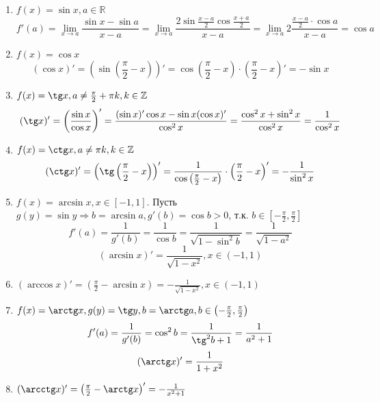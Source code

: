 \documentclass[12pt]{article}
\newenvironment{MyList}[1][4pt]{
  \begin{enumerate}[1.]
  \setlength{\parskip}{0pt}
  \setlength{\itemsep}{#1}
}{       
  \end{enumerate}
}
\def\R{\mathbb{R}}       %
\def\Z{\mathbb{Z}}       %
\def\SO{\Rightarrow}     %
\theoremstyle{definition} %
\theoremstyle{plain} %
\theoremstyle{remark} %
\begin{document}
\begin{MyList}
    \[f'(0) = \lim_{x \to 0} \frac{x^\alpha}{x} = \lim_{x \to 0} x^{\alpha - 1} = \begin{cases}
        0, \alpha > 1 \\
        1, \alpha = 1 \\
        \infty, \alpha < 1
    \end{cases}\]
    Выводы: $(x^\alpha)' = \alpha \cdot x^{\alpha - 1}$ (с точностью до области определения функции).

    \item $f(x) = \sin x, a \in \R$ 
    \[f'(a) = \lim_{x \to a} \frac{\sin x - \sin a}{x - a} = \lim_{x \to a} \frac{2 \sin \frac{x - a}{2} \cos \frac{x + a}{2}}{x - a} = \lim_{x \to a}2 \frac{ \frac{x - a}{2} \cdot \cos a}{x - a} = \cos a\]
    
    \item $f(x) = \cos x$
    \[(\cos x)' = \left(\sin \left(\frac{\pi}{2} - x\right)\right)' = \cos \left(\frac{\pi}{2} - x\right) \cdot \left(\frac{\pi}{2} - x\right)' = -\sin x\]

    \item $f(x) = \tg x, a \neq \frac{\pi}{2} + \pi k, k \in \Z$ 
    \[(\tg x)' = \left( \frac{\sin x}{\cos x}\right)' = \frac{(\sin x)' \cos x - \sin x (\cos x)'}{\cos^2 x} = \frac{\cos^2 x + \sin^2x}{\cos^2 x} = \frac{1}{\cos^2 x}\]

    \item $f(x) = \ctg x, a \neq \pi k, k \in \Z$ 
    \[(\ctg x)' = \left(\tg \left(\frac{\pi}{2} - x\right)\right)' = \frac{1}{\cos \left(\frac{\pi}{2} - x\right)} \cdot \left(\frac{\pi}{2} - x\right)' = -\frac{1}{\sin^2 x}\]

    \item $f(x) = \arcsin x, x \in [-1, 1]$. Пусть $g(y) = \sin y \SO b = \arcsin a, g'(b) = \cos b > 0$, т.к. $b \in \left[-\frac{\pi}{2}, \frac{\pi}{2}\right]$ 
    \[f'(a) = \frac{1}{g'(b)} = \frac{1}{\cos b} = \frac{1}{\sqrt{1 - \sin^2 b}} = \frac{1}{\sqrt{1 - a^2}}\]
    \[(\arcsin x)' = \frac{1}{\sqrt{1 - x^2}}, x \in (-1, 1)\]

    \item $(\arccos x)' = \left(\frac{\pi}{2} - \arcsin x\right) = -\frac{1}{\sqrt{1 - x^2}}, x \in (-1, 1)$
    \item $f(x) = \arctg x, g(y) = \tg y, b = \arctg a, b \in \left(-\frac{\pi}{2}, \frac{\pi}{2}\right)$
    \[f'(a) = \frac{1}{g'(b)} = \cos^2 b = \frac{1}{\tg^2 b + 1} = \frac{1}{a^2 + 1}\]
    \[(\arctg x)' = \frac{1}{1 + x^2}\]

    \item $(\arcctg x)' = \left(\frac{\pi}{2} - \arctg x\right)' = -\frac{1}{x^2 + 1}$ 
\end{MyList} 
\end{document}
